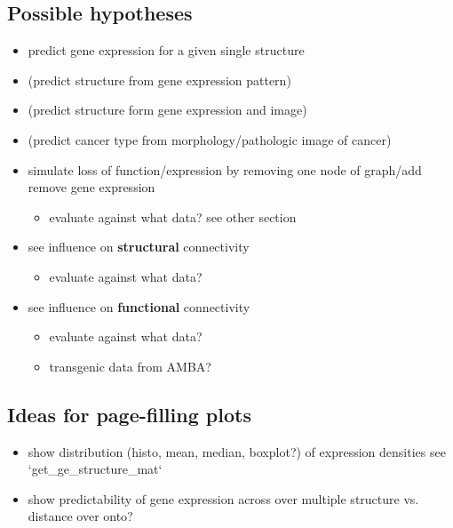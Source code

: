 \documentclass[]{article}
\renewcommand{\cite}{\citep}
\begin{document}
\subsection*{Possible hypotheses}
\begin{itemize}
	\item predict gene expression for a given single structure
	\item (predict structure from gene expression pattern)
	\item (predict structure form gene expression and image)
	\item (predict cancer type from morphology/pathologic image of cancer)
	\item simulate loss of function/expression by removing one node of graph/add remove gene expression
	\begin{itemize}
		\item evaluate against what data? see other section
	\end{itemize}
	\item see influence on \textbf{structural} connectivity
	\begin{itemize}
		\item evaluate against what data?
	\end{itemize}
	\item see influence on \textbf{functional} connectivity
	\begin{itemize}
		\item evaluate against what data? \cite{Zerbi2021}
		\item transgenic data from AMBA?
	\end{itemize}
\end{itemize}

\subsection*{Ideas for page-filling plots}
\begin{itemize}
	\item show distribution (histo, mean, median, boxplot?) of expression densities see `get\_ge\_structure\_mat`
	\item show predictability of gene expression across over multiple structure vs. distance over onto?
\end{itemize}
\end{document}
